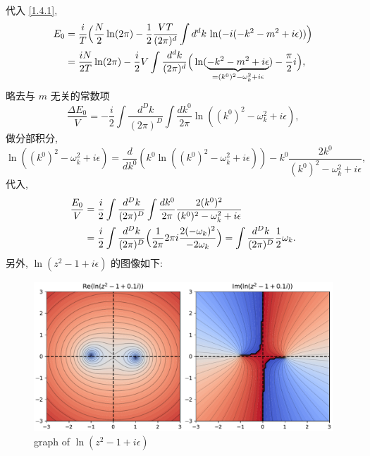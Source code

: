 \begin{itemize}
\begin{tcolorbox}[title=calculation:]
		代入 \eqref{1.4.1},
		\begin{align}
			E_0 &= \frac{i}{T} \Big( \frac{N}{2} \ln (2 \pi) - \frac{1}{2} \frac{V T}{(2 \pi)^d} \int d^d k \, \ln(- i (- k^2 - m^2 + i \epsilon)) \Big) \notag \\
			&= \frac{i N}{2 T} \ln (2 \pi) - \frac{i}{2} V \int \frac{d^d k}{(2 \pi)^d} \Big( \ln(\underbrace{- k^2 - m^2 + i \epsilon}_{= (k^0)^2 - \omega_k^2 + i \epsilon}) - \frac{\pi}{2} i \Big),
		\end{align}
		略去与 $m$ 无关的常数项
		\begin{equation}
			\frac{\Delta E_0}{V} = - \frac{i}{2} \int \frac{d^D k}{(2 \pi)^D} \int \frac{dk^0}{2 \pi} \ln((k^0)^2 - \omega_k^2 + i \epsilon),
		\end{equation}
		做分部积分,
		\begin{equation}
			\ln((k^0)^2 - \omega_k^2 + i \epsilon) = \frac{d}{dk^0} (k^0 \ln((k^0)^2 - \omega_k^2 + i \epsilon)) - k^0 \frac{2 k^0}{(k^0)^2 - \omega_k^2 + i \epsilon},
		\end{equation}
		代入,
		\begin{align}
			\frac{E_0}{V} &= \frac{i}{2} \int \frac{d^D k}{(2 \pi)^D} \int \frac{dk^0}{2 \pi} \frac{2 (k^0)^2}{(k^0)^2 - \omega_k^2 + i \epsilon} \notag \\
			&= \frac{i}{2} \int \frac{d^D k}{(2 \pi)^D} \Big( \frac{1}{2 \pi} 2 \pi i \frac{2 (- \omega_k)^2}{- 2 \omega_k} \Big) = \int \frac{d^D k}{(2 \pi)^D} \frac{1}{2} \omega_k.
		\end{align}
		另外, $\ln(z^2 - 1 + i \epsilon)$ 的图像如下:
		
		\begin{figure}[H]
			\centering
			\includegraphics[scale=0.5]{figures/ln(z^2 - 1 + i epsilon).pdf}
			\caption{graph of $\ln(z^2 - 1 + i \epsilon)$}
		\end{figure}
	\end{tcolorbox}
\end{itemize}
